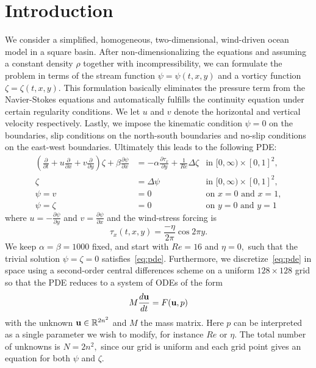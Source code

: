 \section{Introduction}
We consider a simplified, homogeneous, two-dimensional, wind-driven ocean model in a square basin. After non-dimensionalizing the equations and assuming a constant density $\rho$ together with incompressibility, we can formulate the problem in terms of the stream function $\psi = \psi(t, x, y)$ and a vorticy function $\zeta = \zeta(t, x, y).$ This formulation basically eliminates the pressure term from the Navier-Stokes equations and automatically fulfills the continuity equation under certain regularity conditions. We let $u$ and $v$ denote the horizontal and vertical velocity respectively. Lastly, we impose the kinematic condition $\psi = 0$ on the boundaries, slip conditions on the north-south boundaries and no-slip conditions on the east-west boundaries. Ultimately this leads to the following PDE:
\begin{equation}\label{eq:pde}
\begin{aligned}
  \left(\frac{\partial}{\partial t} + u \frac{\partial}{\partial x} + v \frac{\partial}{\partial y}\right) \zeta + \beta \frac{\partial \psi}{\partial x} &= -\alpha \frac{\partial \tau_x}{\partial y} + \frac{1}{Re} \Delta \zeta & \text{in } [0, \infty) \times [0,1]^2, \\
  \zeta &= \Delta \psi & \text{in } [0, \infty) \times [0,1]^2, \\
  \psi = v &= 0 & \text{on } x = 0 \text{ and } x = 1, \\
  \psi = \zeta &= 0 & \text{on } y = 0 \text{ and } y = 1
\end{aligned}
\end{equation}
where $u = -\frac{\partial \psi}{\partial y}$ and $v = \frac{\partial \psi}{\partial x}$ and the wind-stress forcing is
\begin{equation}
  \tau_x(t, x, y) = \frac{- \eta}{2 \pi} \cos{2\pi y}.
 \label{eq:tau}
\end{equation}
We keep $\alpha = \beta = 1000$ fixed, and start with $Re = 16$ and $\eta = 0,$ such that the trivial solution $\psi = \zeta = 0$ satisfies~\eqref{eq:pde}. Furthermore, we discretize~\eqref{eq:pde} in space using a second-order central differences scheme on a uniform $128\times128$ grid so that the PDE reduces to a system of ODEs of the form
\begin{equation}\label{eq:ode}
  M \frac{d \mathbf{u}}{d t} = F(\mathbf{u}, p)
\end{equation}
with the unknown $\mathbf{u} \in \mathbb{R}^{2n^2}$ and $M$ the mass matrix. Here $p$ can be interpreted as a single parameter we wish to modify, for instance $Re$ or $\eta.$ The total number of unknowns is $N = 2 n^2,$ since our grid is uniform and each grid point gives an equation for both $\psi$ and $\zeta.$

